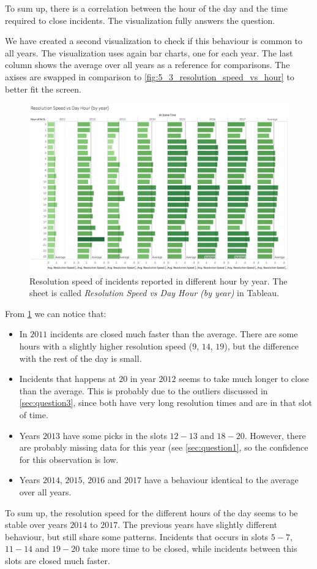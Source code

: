 To sum up, there is a correlation between the hour of the day and the time required to close incidents.
The visualization fully answers the question.

We have created a second visualization to check if this behaviour is common to all years.
The visualization uses again bar charts, one for each year.
The last column shows the average over all years as a reference for comparisons.
The axises are swapped in comparison to \cref{fig:5_3_resolution_speed_vs_hour} to better fit the screen.

\begin{figure}[h]
	\centering
	\includegraphics[width=0.9\columnwidth]{figures/5_3_resolution_speed_vs_hour_by_year}
	\caption{Resolution speed of incidents reported in different hour by year. The sheet is called \textit{Resolution Speed vs Day Hour (by year)} in Tableau.}
	\label{fig:5_3_resolution_speed_vs_hour_by_year}
\end{figure}

From \cref{fig:5_3_resolution_speed_vs_hour_by_year} we can notice that:
\begin{itemize}
    \item In $2011$ incidents are closed much faster than the average. There are some hours with a slightly higher resolution speed ($9$, $14$, $19$), but the difference with the rest of the day is small.
    \item Incidents that happens at $20$ in year $2012$ seems to take much longer to close than the average. This is probably due to the outliers discussed in \cref{sec:question3}, since both have very long resolution times and are in that slot of time.
    \item Years $2013$ have some picks in the slots $12 - 13$ and $18 - 20$. However, there are probably missing data for this year (see \cref{sec:question1}, so the confidence for this observation is low.
    \item Years $2014$, $2015$, $2016$ and $2017$ have a behaviour identical to the average over all years.    
\end{itemize}

To sum up, the resolution speed for the different hours of the day seems to be stable over years $2014$ to $2017$.
The previous years have slightly different behaviour, but still share some patterns.
Incidents that occurs in slots $5 - 7$, $11 - 14$ and $19 - 20$ take more time to be closed, while incidents between this slots are closed much faster.
